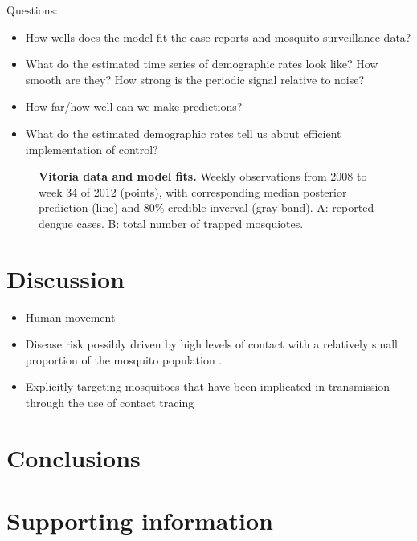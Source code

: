 \documentclass[10pt,letterpaper]{article}
\begin{document}
Questions:
\begin{itemize}
\item How wells does the model fit the case reports and mosquito surveillance data?
\item What do the estimated time series of demographic rates look like? How smooth are they? How strong is the periodic signal relative to noise?
\item How far/how well can we make predictions?
\item What do the estimated demographic rates tell us about efficient implementation of control?
\end{itemize}


\begin{figure}[!h]
\caption{{\bf Vitoria data and model fits.}
Weekly observations from 2008 to week 34 of 2012 (points), with corresponding median posterior prediction (line) and 80\% credible inverval (gray band). A: reported dengue cases. B: total number of trapped mosquiotes.
}
\label{timeseries}
\end{figure}


\section*{Discussion}

\begin{itemize}
\item Human movement \cite{Adams2009, Cosner2009a, Stoddard2009, Dalziel2013}
\item Disease risk possibly driven by high levels of contact with a relatively small proportion of the mosquito population \cite{Canyon1999}.
\item Explicitly targeting mosquitoes that have been implicated in transmission through the use of contact tracing \cite{Vazquez-Prokopec2017}
\end{itemize}

\section*{Conclusions}

\section*{Supporting information}

\end{document}
